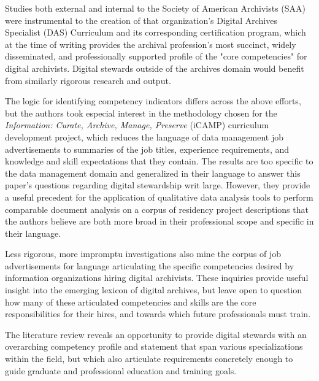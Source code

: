 \documentclass{acm_proc_article-sp}
\begin{document}
Studies both external\cite{16} and internal\cite{17} to the Society of American Archivists (SAA) were instrumental to the creation of that organization's Digital Archives Specialist (DAS) Curriculum and its corresponding certification program, which at the time of writing provides the archival profession's most succinct, widely disseminated, and professionally supported profile of the "core competencies" for digital archivists\cite{18}. Digital stewards outside of the archives domain would benefit from similarly rigorous research and output.

The logic for identifying competency indicators differs across the above efforts, but the authors took especial interest in the methodology chosen for the \textit{Information: Curate, Archive, Manage, Preserve} (iCAMP) curriculum development project, which reduces the language of data management job advertisements to summaries of the job titles, experience requirements, and knowledge and skill expectations that they contain\cite{19}. The results are too specific to the data management domain and generalized in their language to answer this paper's questions regarding digital stewardship writ large. However, they provide a useful precedent for the application of qualitative data analysis tools to perform comparable document analysis on a corpus of residency project descriptions that the authors believe are both more broad in their professional scope and specific in their language. 

Less rigorous, more impromptu investigations\cite{20, 21} also mine the corpus of job advertisements for language articulating the specific competencies desired by information organizations hiring digital archivists. These inquiries provide useful insight into the emerging lexicon of digital archives, but leave open to question how many of these articulated competencies and skills are the core responsibilities for their hires, and towards which future professionals must train.

The literature review reveals an opportunity to provide digital stewards with an overarching competency profile and statement that span various specializations within the field, but which also articulate requirements concretely enough to guide graduate and professional education and training goals. 
\end{document}
